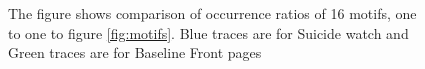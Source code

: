 \begin{figure}[!t]
	
	\label{fig:MotifOccurance}
	\vspace{-0.4cm}
	\caption{ The figure shows comparison of occurrence ratios of 16 motifs, one to one to figure \ref{fig:motifs}. Blue traces are for Suicide watch and Green traces are for Baseline Front pages}
	\vspace{-0.4cm}
\end{figure}